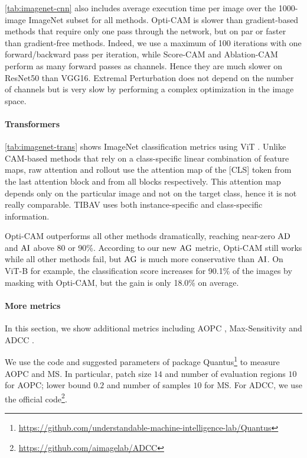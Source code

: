 \noindent \autoref{tab:imagenet-cnn} also includes average execution time per image over the 1000-image 
ImageNet subset for all methods. Opti-CAM is slower than gradient-based methods that require 
only one pass through the network, but on par or faster than gradient-free methods. 
Indeed, we use a maximum of 100 iterations with one forward/backward pass per iteration, 
while Score-CAM and Ablation-CAM perform as many forward passes as channels. Hence they are much 
slower on ResNet50 than VGG16. Extremal Perturbation does not depend on the number of channels but 
is very slow by performing a complex optimization in the image space.

\paragraph{Transformers}
\autoref{tab:imagenet-trans} shows ImageNet classification metrics using ViT . 
Unlike CAM-based methods that rely on a class-specific linear combination of feature maps, 
raw attention \autocite{dosovitskiy2020image} and rollout \autocite{abnar2020quantifying} use the 
attention map of the [CLS] token from the last attention block and from all blocks respectively. 
This attention map depends only on the particular image and not on the target class, hence it 
is not really comparable. TIBAV \autocite{chefer2021transformer} uses both instance-specific and 
class-specific information.

Opti-CAM outperforms all other methods dramatically, reaching near-zero $\operatorname{AD}$ and $\operatorname{AI}$ above 80 or 
90\%. According to our new $\operatorname{AG}$ metric, Opti-CAM still works while all other methods fail, 
but $\operatorname{AG}$ is much more conservative than $\operatorname{AI}$. On ViT-B for example, the classification score 
increases for 90.1\% of the images by masking with Opti-CAM, but the gain is only 18.0\% on average.

\paragraph{More metrics}
In this section, we show additional metrics including AOPC \autocite{samek2016evaluating}, 
Max-Sensitivity\autocite{yeh2019fidelity} and ADCC \autocite{poppi2021revisiting}.

We use the code and suggested parameters of package 
Quantus\footnote{\url{https://github.com/understandable-machine-intelligence-lab/Quantus}} to 
measure AOPC and MS. In particular, patch size $14$ and number of evaluation regions $10$ for AOPC; 
lower bound $0.2$ and number of samples $10$ for MS.
For ADCC, we use the official code\footnote{\url{https://github.com/aimagelab/ADCC}}.\\

